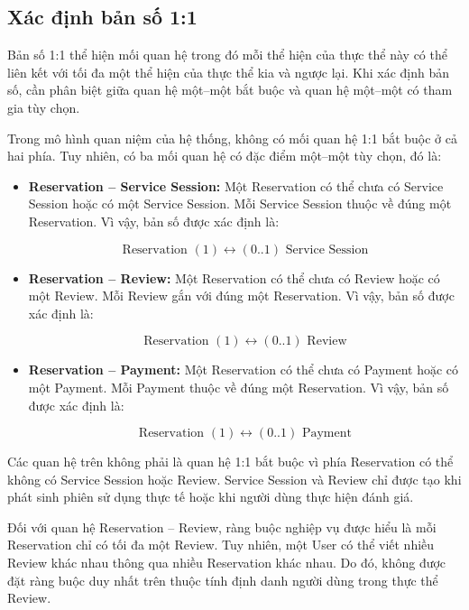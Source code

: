 \subsection{Xác định bản số 1:1}

Bản số 1:1 thể hiện mối quan hệ trong đó mỗi thể hiện của thực thể này có thể liên kết với tối đa một thể hiện của thực thể kia và ngược lại. Khi xác định bản số, cần phân biệt giữa quan hệ một--một bắt buộc và quan hệ một--một có tham gia tùy chọn.

Trong mô hình quan niệm của hệ thống, không có mối quan hệ 1:1 bắt buộc ở cả hai phía. Tuy nhiên, có ba mối quan hệ có đặc điểm một--một tùy chọn, đó là:

\begin{itemize}

\item \textbf{Reservation -- Service Session:} Một Reservation có thể chưa có Service Session hoặc có một Service Session. Mỗi Service Session thuộc về đúng một Reservation. Vì vậy, bản số được xác định là:

\[
\text{Reservation } (1) \longleftrightarrow (0..1) \text{ Service Session}
\]

\item \textbf{Reservation -- Review:} Một Reservation có thể chưa có Review hoặc có một Review. Mỗi Review gắn với đúng một Reservation. Vì vậy, bản số được xác định là:

\[
\text{Reservation } (1) \longleftrightarrow (0..1) \text{ Review}
\]

\item \textbf{Reservation -- Payment:} Một Reservation có thể chưa có Payment hoặc có một Payment. Mỗi Payment thuộc về đúng một Reservation. Vì vậy, bản số được xác định là:

\[
\text{Reservation } (1) \longleftrightarrow (0..1) \text{ Payment}
\]

\end{itemize}

Các quan hệ trên không phải là quan hệ 1:1 bắt buộc vì phía Reservation có thể không có Service Session hoặc Review. Service Session và Review chỉ được tạo khi phát sinh phiên sử dụng thực tế hoặc khi người dùng thực hiện đánh giá.

Đối với quan hệ Reservation -- Review, ràng buộc nghiệp vụ được hiểu là mỗi Reservation chỉ có tối đa một Review. Tuy nhiên, một User có thể viết nhiều Review khác nhau thông qua nhiều Reservation khác nhau. Do đó, không được đặt ràng buộc duy nhất trên thuộc tính định danh người dùng trong thực thể Review.


